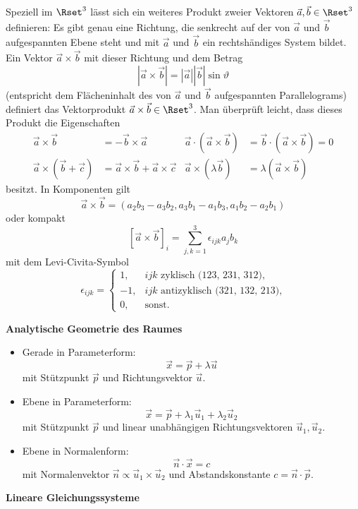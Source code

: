 \documentclass[a4paper,10pt]{article}
\begin{document}
Speziell im $\Rset^3$ lässt sich ein weiteres Produkt zweier Vektoren
$\vec{a},\vec{b}\in \Rset^3$ definieren: Es gibt genau eine Richtung, die
senkrecht auf der von $\vec{a}$ und $\vec{b}$ aufgespannten Ebene steht
und mit $\vec{a}$ und $\vec{b}$ ein rechtshändiges System bildet. Ein
Vektor $\vec{a}\times\vec{b}$ mit dieser Richtung und dem Betrag
\[
|\vec{a}\times\vec{b}|=|\vec{a}||\vec{b}|\sin\vartheta
\]
(entspricht dem Flächeninhalt des von $\vec{a}$ und $\vec{b}$ aufgespannten
Parallelograms) definiert das Vektorprodukt $\vec{a}\times\vec{b}\in\Rset^3$.
Man überprüft leicht, dass dieses Produkt die Eigenschaften
\begin{align*}
\vec{a}\times \vec{b} &= -\vec{b}\times \vec{a} &
\vec{a}\cdot(\vec{a}\times\vec{b})&=\vec{b}\cdot(\vec{a}\times\vec{b})=0\\
\vec{a}\times (\vec{b}+\vec{c}) &= \vec{a}\times \vec{b} + \vec{a}\times \vec{c} &
\vec{a}\times (\lambda \vec{b}) &= \lambda (\vec{a}\times \vec{b})
\end{align*}
besitzt.
In Komponenten gilt
\[
\vec{a}\times \vec{b} = (a_2b_3-a_3b_2,a_3b_1-a_1b_3,a_1b_2-a_2b_1)
\]
oder kompakt
\[
[\vec{a}\times \vec{b}]_i = \sum_{j,k=1}^3 \epsilon_{ijk}a_jb_k
\]
mit dem Levi-Civita-Symbol
\[
\epsilon_{ijk} = \left\{\begin{array}{rl}1,&ijk\textrm{~zyklisch~(123,~231,~312),}\\-1,&ijk\textrm{~antizyklisch~(321,~132,~213),}\\0,&\textrm{sonst.}\end{array}\right.
\]

\pagebreak

{\bf Analytische Geometrie des Raumes}

\begin{itemize}
\item Gerade in Parameterform:
\[
\vec{x}=\vec{p}+\lambda\vec{u}
\]
mit Stützpunkt $\vec{p}$ und Richtungsvektor $\vec{u}$.

\item Ebene in Parameterform:
\[
\vec{x}=\vec{p}+\lambda_1\vec{u}_1+\lambda_2\vec{u}_2
\]
mit Stützpunkt $\vec{p}$ und linear unabhängigen Richtungsvektoren
$\vec{u}_1,\vec{u}_2$.

\item Ebene in Normalenform:
\[
\vec{n}\cdot\vec{x}=c
\]
mit Normalenvektor $\vec{n}\propto \vec{u}_1\times\vec{u}_2$ und
Abstandskonstante $c=\vec{n}\cdot\vec{p}$.
\end{itemize}

{\bf Lineare Gleichungssysteme}
\end{document}
